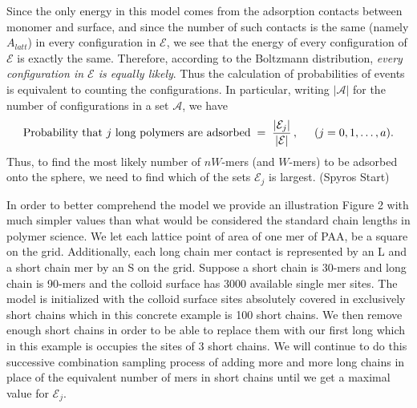 \documentclass[journal=mamobx,manuscript=article]{achemso}
\begin{document}
Since the only energy in this model comes from the adsorption contacts between monomer and surface,
and since the number of such contacts is the same (namely $A_{latt}$) in every configuration
in $\mathcal{E}$, we see that the energy of every configuration of $\mathcal{E}$ is exactly the same.
Therefore, according to the Boltzmann distribution, \textit{every configuration in $\mathcal{E}$ is equally
likely}.  Thus the calculation of probabilities of events is equivalent to counting the configurations.
In particular, writing $|\mathcal{A}|$ for the number of configurations in a set $\mathcal{A}$, we have
\[
    \hbox{Probability that $j$ long polymers are adsorbed}  \;=\; 
    \frac{|\mathcal{E}_j|}{|\mathcal{E}|}\,,   \hspace{5mm}(j=0,1,\ldots,a).
\]
Thus, to find the most likely number of $nW$-mers (and $W$-mers) to be adsorbed onto the sphere,
we need to find which of the sets $\mathcal{E}_j$ is largest.
(Spyros Start)

In order to better comprehend the model we provide an illustration Figure 2 with much simpler values than what would be considered the standard chain lengths in polymer science. We let each lattice point of area of one mer of PAA, be a square on the grid. Additionally, each long chain mer contact is represented by an L and a short chain mer by an S on the grid.  Suppose a short chain is 30-mers and long chain is 90-mers and the colloid surface has 3000 available single mer sites. The model is initialized with the colloid surface sites absolutely covered in exclusively short chains  which in this concrete example is 100 short chains. We then remove enough short chains in order to be able to replace them with our first long which in this example is occupies the sites of 3  short chains. We will continue to do this successive combination sampling process of adding more and more long chains in place of the equivalent number of mers in short chains until we get a maximal value for $\mathcal{E}_{j}$.
\end{document}
